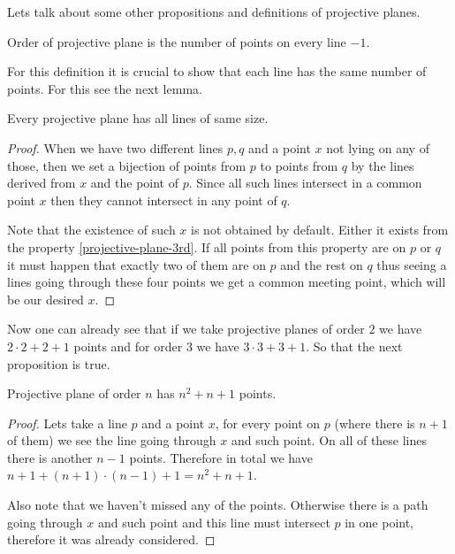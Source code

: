Lets talk about some other propositions and definitions of projective planes.

\begin{defn}
	Order of projective plane is the number of points on every line $-1$.
\end{defn}

For this definition it is crucial to show that each line has the same number of points. For this see the next lemma.

\begin{lemma}
	Every projective plane has all lines of same size.
\end{lemma}

\begin{proof}
	When we have two different lines $p,q$ and a point $x$ not lying on any of those, then we set a bijection of points from $p$ to points from $q$ by the lines derived from $x$ and the point of $p$. Since all such lines intersect in a common point $x$ then they cannot intersect in any point of $q$.
	
	Note that the existence of such $x$ is not obtained by default. Either it exists from the property \ref{projective-plane-3rd}. If all points from this property are on $p$ or $q$ it must happen that exactly two of them are on $p$ and the rest on $q$ thus seeing a lines going through these four points we get a common meeting point, which will be our desired $x$.
\end{proof}

Now one can already see that if we take projective planes of order $2$ we have $2 \cdot 2 + 2 + 1$ points and for order $3$ we have $3 \cdot 3 + 3 + 1$. So that the next proposition is true.

\begin{prop}
	Projective plane of order $n$ has $n^2 + n + 1$ points.
\end{prop}

\begin{proof}
	Lets take a line $p$ and a point $x$, for every point on $p$ (where there is $n+1$ of them) we see the line going through $x$ and such point. On all of these lines there is another $n-1$ points. Therefore in total we have $n+1 + (n+1) \cdot (n-1) +1 = n^2 + n +1$.
	
	Also note that we haven't missed any of the points. Otherwise there is a path going through $x$ and such point and this line must intersect $p$ in one point, therefore it was already considered.
\end{proof}

